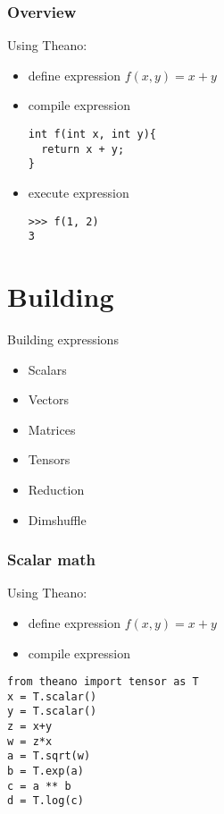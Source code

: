 \documentclass[utf8x,xcolor=pdftex,dvipsnames,table]{beamer}
\begin{document}
\begin{frame}[fragile]
  \frametitle{Overview}
  Using Theano:
  \begin{itemize}
  \item define expression $f(x,y) = x + y$
  \item compile expression
\begin{lstlisting}
int f(int x, int y){
  return x + y;
}
\end{lstlisting}

  \item execute expression
\begin{lstlisting}
>>> f(1, 2)
3
\end{lstlisting}
  \end{itemize}
\end{frame}


\section{Building}
\begin{frame}{Building expressions}
  \begin{itemize}
  \item Scalars
  \item Vectors
  \item Matrices
  \item Tensors
  \item Reduction
  \item Dimshuffle
  \end{itemize}
\end{frame}

\begin{frame}[fragile]
  \frametitle{Scalar math}
  Using Theano:
  \begin{itemize}
  \item define expression $f(x,y) = x + y$
  \item compile expression
  \end{itemize}
\begin{lstlisting}
from theano import tensor as T
x = T.scalar()
y = T.scalar()
z = x+y
w = z*x
a = T.sqrt(w)
b = T.exp(a)
c = a ** b
d = T.log(c)
\end{lstlisting}
\end{frame}
\end{document}
